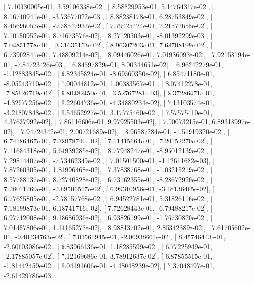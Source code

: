 \documentclass{article}
\begin{document}
       [  7.10930005e-01,   3.59106338e-02],
       [  8.58829953e-01,   5.14764317e-02],
       [  8.16740941e-01,  -3.73677022e-03],
       [  8.88238178e-01,   6.28753849e-02],
       [  8.45696052e-01,  -9.38547932e-02],
       [  7.79425424e-01,   2.21572655e-02],
       [  7.10150952e-01,   8.71673576e-02],
       [  8.27120303e-01,  -8.01392299e-03],
       [  7.04851778e-01,  -3.31635153e-02],
       [  8.96307203e-01,   7.68708199e-02],
       [  6.73902841e-01,   7.48809214e-02],
       [  8.09446026e-01,   7.01936093e-02],
       [  7.92158194e-01,  -7.84723426e-03],
       [  6.84697829e-01,   8.00344651e-02],
       [  6.96242279e-01,  -1.12883845e-02],
       [  6.82345824e-01,  -8.69360350e-02],
       [  6.85471180e-01,  -8.05243710e-02],
       [  7.00044812e-01,   1.00383567e-01],
       [  8.07412278e-01,  -7.85926719e-02],
       [  6.80482450e-01,  -3.52767281e-03],
       [  8.37286471e-01,  -4.32977256e-02],
       [  8.22604736e-01,  -4.34880234e-02],
       [  7.13103574e-01,  -3.21807848e-02],
       [  8.54652927e-01,   3.17775460e-02],
       [  7.57575410e-01,   4.37637992e-02],
       [  7.86116606e-01,   9.97925503e-02],
       [  7.00073215e-01,   6.89318997e-02],
       [  7.94724342e-01,   2.00721689e-02],
       [  8.96587284e-01,  -1.51919320e-02],
       [  6.74186467e-01,   7.38978740e-02],
       [  7.11415664e-01,  -7.20152270e-02],
       [  7.11684318e-01,   5.64939285e-02],
       [  8.77948247e-01,  -8.95012139e-02],
       [  7.29814407e-01,  -7.73462349e-02],
       [  7.01501500e-01,  -1.12611682e-03],
       [  7.87260305e-01,   1.81996468e-02],
       [  7.37838768e-01,  -1.03215219e-02],
       [  8.57788137e-01,   8.72740828e-02],
       [  6.73162355e-01,  -8.28672920e-02],
       [  7.28011269e-01,  -2.89506517e-02],
       [  6.99310956e-01,  -3.18136465e-02],
       [  6.77625805e-01,  -2.78157768e-02],
       [  6.94522781e-01,   5.31826116e-02],
       [  7.18199873e-01,   6.18741716e-02],
       [  7.72628443e-01,  -6.79488217e-02],
       [  6.97742008e-01,   9.18686936e-02],
       [  6.93826199e-01,  -1.76730820e-02],
       [  7.01457806e-01,   1.14165273e-02],
       [  8.98813702e-01,   2.85342389e-02],
       [  7.61705602e-01,  -9.40234763e-02],
       [  7.03561945e-01,  -2.06938664e-02],
       [  8.45746443e-01,  -2.60603086e-02],
       [  6.83966136e-01,   1.18285599e-02],
       [  6.77225949e-01,  -2.17885057e-02],
       [  7.12169686e-01,   3.78912637e-02],
       [  6.87855515e-01,  -1.81442459e-02],
       [  8.04191606e-01,  -4.48048239e-02],
       [  7.37048497e-01,  -2.61429786e-03],
\end{document}
